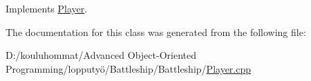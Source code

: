 Implements \mbox{\hyperlink{class_player_a368527cfefaac58dc942b32658f977ed}{Player}}.



The documentation for this class was generated from the following file\+:\begin{DoxyCompactItemize}
\item 
D\+:/kouluhommat/\+Advanced Object-\/\+Oriented Programming/lopputyö/\+Battleship/\+Battleship/\mbox{\hyperlink{_player_8cpp}{Player.\+cpp}}\end{DoxyCompactItemize}
